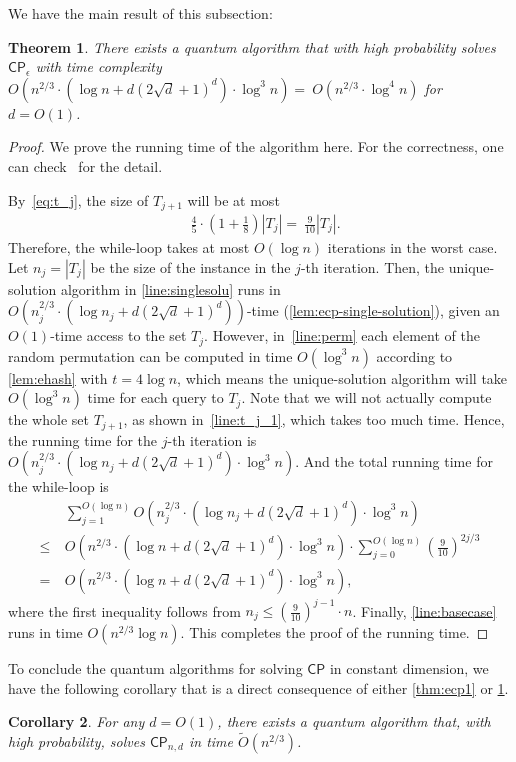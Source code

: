 \documentclass[10pt,a4paper]{article}
\newtheorem{theorem}{Theorem}
\newtheorem{corollary}[theorem]{Corollary}
\newcommand{\wt}{\widetilde}
\newcommand{\CP}{\ensuremath{\mathsf{CP}}}
\newcommand{\eCP}{\mathsf{CP}_{\epsilon}}
\begin{document}
We have the main result of this subsection:
\begin{theorem}
  \label{thm:ecp2}
  There exists a quantum algorithm that with high probability solves $\eCP$ with time complexity $O(n^{2/3}\cdot (\log n + d(2\sqrt{d}+1)^d)\cdot \log^3 n)=~O(n^{2/3}\cdot \log^4 n)$ for $d=O(1)$.
\end{theorem}
\begin{proof}
We prove the running time of the algorithm here. For the correctness, one can check~\cite{r5} for the detail.

By~\cref{eq:t_j}, the size of $T_{j+1}$ will be at most 
\begin{align}
    &\frac{4}{5} \cdot (1+\frac{1}{8}) |T_j| =~ \frac{9}{10}|T_j|. 
\end{align}
Therefore, the while-loop takes at most $O(\log n)$ iterations in the worst case. Let $n_j=|T_j|$ be the size of the instance in the $j$-th iteration. Then, the unique-solution algorithm in \cref{line:singlesolu} runs in $O(n_j^{2/3}\cdot (\log n_j + d(2\sqrt{d}+1)^d))$-time (\cref{lem:ecp-single-solution}), given an $O(1)$-time access to the set $T_j$. However, in~\cref{line:perm} each element of the random permutation can be computed in time $O(\log^3 n)$ according to \cref{lem:ehash} with $t = 4\log n$, which means the unique-solution algorithm will take $O(\log^3 n)$ time for each query to $T_j$. Note that we will not actually compute the whole set $T_{j+1}$, as shown in~\cref{line:t_j_1}, which takes too much time. 
Hence, the running time for the $j$-th iteration is $O(n_j^{2/3}\cdot (\log n_j + d(2\sqrt{d}+1)^d)\cdot \log^3 n)$. And the total running time for the while-loop is
\begin{align}
    &~\sum_{j=1}^{O(\log n)} O(n_j^{2/3}\cdot (\log n_j + d(2\sqrt{d}+1)^d)\cdot \log^3 n)\\
    \leq &~ O(n^{2/3}\cdot (\log n + d(2\sqrt{d}+1)^d)\cdot \log^3 n)\cdot \sum_{j=0}^{O(\log n)} \left(\frac{9}{10}\right)^{2j/3}\\
    = &~ O(n^{2/3}\cdot (\log n + d(2\sqrt{d}+1)^d)\cdot \log^3 n),
\end{align}
where the first inequality follows from $n_j\leq (\frac{9}{10})^{j-1}\cdot n$.
Finally, \cref{line:basecase} runs in time $O(n^{2/3}\log n)$. This completes the proof of the running time.  
\end{proof}

To conclude the quantum algorithms for solving $\CP$ in constant dimension, we have the following corollary that is a direct consequence of either \cref{thm:ecp1} or \cref{thm:ecp2}.
\begin{corollary}\label{cor:main_cp}
  For any $d=O(1)$, there exists a quantum algorithm that, with high probability, solves $\CP_{n,d}$ in time $\wt{O}(n^{2/3})$.
\end{corollary}
\end{document}
